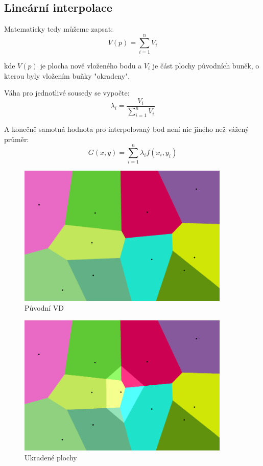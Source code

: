 \documentclass[12pt,a4paper]{article}
\begin{document}
\subsection{Lineární interpolace}
\bigskip
Matematicky tedy můžeme zapsat:
\newline
$$V(p)=\sum_{i=1}^n V_i$$

kde $V(p)$ je plocha nově vloženého bodu a $V_i$ je část plochy původních buněk, o kterou byly vložením buňky "okradeny".

\bigskip
Váha pro jednotlivé sousedy se vypočte:
\newline
$$\lambda_i = \frac{V_i}{\sum_{i=1}^n V_i}$$

\bigskip
A konečně samotná hodnota pro interpolovaný bod není nic jiného než vážený průměr:
\newline
$$G(x,y) = \sum_{i=1}^{n} \lambda_i  f(x_i, y_i)$$

\newpage
\begin{figure}[h!]
\centering
\includegraphics[width=0.9\textwidth]{img/canvas_0.png}
\caption{Původní VD}
\label{fig:fig:canvas0}
\end{figure}

\begin{figure}[h!]
\centering
\includegraphics[width=0.9\textwidth]{img/canvas_1.png}
\caption{Ukradené plochy}
\label{fig:fig:canvas1}
\end{figure}
\end{document}
